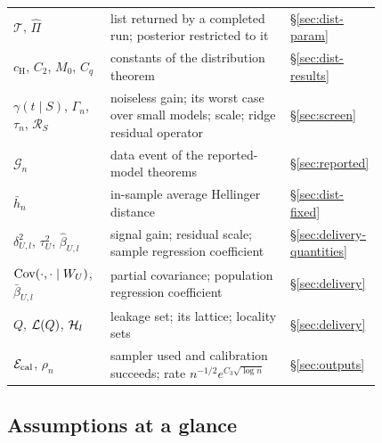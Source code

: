 \begin{longtable}{@{}p{0.27\linewidth}p{0.55\linewidth}l@{}}
$\mathcal T$, $\hat\Pi$ & list returned by a completed run; posterior restricted to it & \S\ref{sec:dist-param} \\
$c_{\mathrm H}$, $C_2$, $M_0$, $C_q$ & constants of the distribution theorem & \S\ref{sec:dist-results} \\
$\gamma(t\mid S)$, $\Gamma_n$, $\tau_n$, $\mathcal R_S$ & noiseless gain; its worst case over small models; scale; ridge residual operator & \S\ref{sec:screen} \\
$\mathcal G_n$ & data event of the reported-model theorems & \S\ref{sec:reported} \\
$\bar h_n$ & in-sample average Hellinger distance & \S\ref{sec:dist-fixed} \\
$\delta^2_{U,l}$, $\tau^2_U$, $\hat\beta_{U,l}$ & signal gain; residual scale; sample regression coefficient & \S\ref{sec:delivery-quantities} \\
$\operatorname{Cov}(\cdot,\cdot\mid W_U)$, $\bar\beta_{U,l}$ & partial covariance; population regression coefficient & \S\ref{sec:delivery} \\
$Q$, $\mathcal L(Q)$, $\mathcal H_l$ & leakage set; its lattice; locality sets & \S\ref{sec:delivery} \\
$\mathcal E_{\mathrm{cal}}$, $\rho_n$ & sampler used and calibration succeeds; rate $n^{-1/2}e^{C_3\sqrt{\log n}}$ & \S\ref{sec:outputs} \\
\bottomrule
\end{longtable}

\subsection*{Assumptions at a glance}

